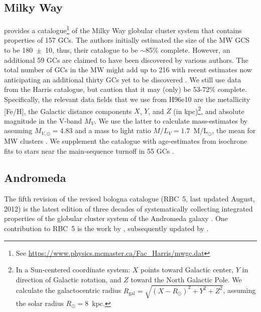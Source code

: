 \documentclass[a4paper,fleqn,usenatbib]{mnras}
\begin{document}
\subsection{Milky Way}
\label{sec:milkyway}
\citet[][2010 edition; hereafter H96e10]{1996AJ....112.1487H} provides a
catalogue\footnote{See \url{https://www.physics.mcmaster.ca/Fac_Harris/mwgc.dat}}
of the Milky Way globular cluster system that contains properties of
157 GCs. The authors initially estimated the size of the MW GCS to be 180~$\pm$~10,
thus, their catalogue to be ${\sim}$85\% complete. However, an additional 59 GCs
are claimed to have been discovered by various authors. The total number of GCs
in the MW might add up to 216 with recent estimates now anticipating an additional 
thirty GCs yet to be discovered \citep[e.g.][and references therein]{2018ApJ...863L..38R}.
We still use data from the Harris catalogue, but caution that it may (only) be
53-72\% complete. Specifically, the relevant data fields that we use from H96e10
are the metallicity [Fe/H], the Galactic distance components $X$, $Y$, and $Z$ (in
kpc)\footnote{In a Sun-centered coordinate system: $X$ points toward Galactic
center, $Y$ in direction of Galactic rotation, and $Z$ toward the North Galactic
Pole. We calculate the galactocentric radius $R_{\text{gal}}=\sqrt{(X-R_\odot)^2
+ Y^2 + Z^2}$, assuming the solar radius $R_\odot=8$~kpc.}, and absolute
magnitude in the V-band $M_V$. We use the latter to calculate mass-estimates by
assuming $M_{V,\odot}=4.83$ and a mass to light ratio $M/L_V = 1.7$~M/L$_{\odot}$,
the mean for MW clusters \citep{2005ApJS..161..304M}. We supplement the catalogue
with age-estimates from isochrone fits to stars near the main-sequence turnoff 
in 55 GCs \citep[][hereafter V13]{2013ApJ...775..134V}.


\subsection{Andromeda}
\label{sec:andromeda}
The fifth revision of the revised bologna catalogue (RBC~5, last updated
August, 2012) is the latest edition of three decades of systematically
collecting integrated properties of the globular cluster system of the
Andromeda galaxy \citep[][and references therein]{2004A&A...416..917G}. One
contribution to RBC~5 is the work by \citet[][hereafter C11]{2011AJ....141...61C},
subsequently updated by \citet[][hereafter CR16]{2016ApJ...824...42C}.
\end{document}
